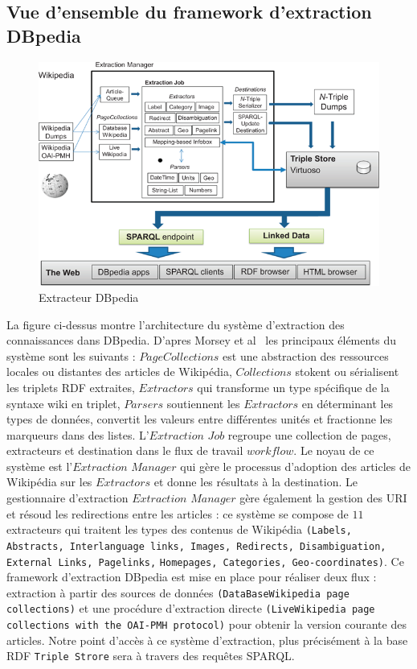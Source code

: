\subsection{Vue d'ensemble du framework d'extraction DBpedia}
\begin{figure}[H]
\centering
\includegraphics[width=12cm]{dbpediaExtra.png}
\caption{Extracteur DBpedia}
\end{figure}
La figure ci-dessus montre l'architecture du système d'extraction des connaissances dans DBpedia.
D'apres Morsey et al~\cite{morsey2012} les principaux éléments du système sont les suivants : $PageCollections$ est une abstraction des ressources locales ou distantes des articles de Wikipédia, $Collections$ stokent ou sérialisent les triplets RDF extraites, $Extractors$ qui transforme un type spécifique de la syntaxe wiki en triplet, $Parsers$ soutiennent les $Extractors$ en déterminant les types de données, convertit les valeurs entre différentes unités et fractionne les marqueurs dans des listes. L'$Extraction$ $Job$ regroupe une collection de pages, extracteurs et destination dans le flux de travail $workflow$.
Le noyau de ce système est l'$Extraction$ $Manager$ qui gère le processus  d'adoption des articles de Wikipédia sur les $Extractors$ et donne les résultats à la destination.
Le gestionnaire d'extraction $Extraction$ $Manager$ gère également la gestion des URI et résoud les redirections entre les articles : ce système se compose de $11$ extracteurs qui traitent les types des contenus de Wikipédia {\tt(Labels, Abstracts, Interlanguage links, Images, Redirects, Disambiguation,
External Links, Pagelinks,}
\newline
{\tt Homepages, Categories, Geo-coordinates)}.
Ce framework d'extraction DBpedia est mise en place pour réaliser deux flux : extraction à partir des sources de données {\tt(DataBaseWikipedia page collections)} et une procédure d'extraction directe
{\tt(LiveWikipedia page collections with the OAI-PMH protocol)} pour obtenir la version courante des articles. Notre point d'accès à ce système d'extraction, plus précisément à la base RDF {\tt Triple Strore} sera à travers des requêtes SPARQL. 
